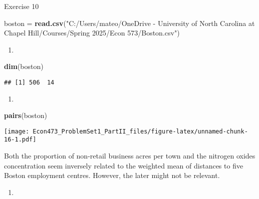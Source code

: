 \documentclass[
]{article}
\newenvironment{Shaded}{\begin{snugshade}}{\end{snugshade}}
\newcommand{\FunctionTok}[1]{\textcolor[rgb]{0.13,0.29,0.53}{\textbf{#1}}}
\newcommand{\NormalTok}[1]{#1}
\newcommand{\OtherTok}[1]{\textcolor[rgb]{0.56,0.35,0.01}{#1}}
\newcommand{\SpecialCharTok}[1]{\textcolor[rgb]{0.81,0.36,0.00}{\textbf{#1}}}
\newcommand{\StringTok}[1]{\textcolor[rgb]{0.31,0.60,0.02}{#1}}
\providecommand{\tightlist}{%
  \setlength{\itemsep}{0pt}\setlength{\parskip}{0pt}}
\begin{document}
Exercise 10

\begin{Shaded}
\begin{Highlighting}[]
\NormalTok{boston }\OtherTok{=} \FunctionTok{read.csv}\NormalTok{(}\StringTok{"C:/Users/mateo/OneDrive {-} University of North Carolina at Chapel Hill/Courses/Spring 2025/Econ 573/Boston.csv"}\NormalTok{)}
\end{Highlighting}
\end{Shaded}

\begin{enumerate}
\def\labelenumi{(\alph{enumi})}
\tightlist
\item
\end{enumerate}

\begin{Shaded}
\begin{Highlighting}[]
\FunctionTok{dim}\NormalTok{(boston)}
\end{Highlighting}
\end{Shaded}

\begin{verbatim}
## [1] 506  14
\end{verbatim}

\begin{enumerate}
\def\labelenumi{(\alph{enumi})}
\setcounter{enumi}{1}
\tightlist
\item
\end{enumerate}

\begin{Shaded}
\begin{Highlighting}[]
\FunctionTok{pairs}\NormalTok{(boston)}
\end{Highlighting}
\end{Shaded}

\texttt{[image: Econ473\_ProblemSet1\_PartII\_files/figure-latex/unnamed-chunk-16-1.pdf]}

Both the proportion of non-retail business acres per town and the
nitrogen oxides concentration seem inversely related to the weighted
mean of distances to five Boston employment centres. However, the later
might not be relevant.

\begin{enumerate}
\def\labelenumi{(\alph{enumi})}
\setcounter{enumi}{2}
\tightlist
\item
\end{enumerate}

\begin{Shaded}
\end{Shaded}
\end{document}
